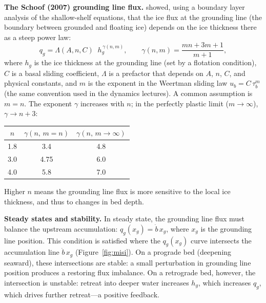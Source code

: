 \documentclass[11pt]{article}
\begin{document}
\medskip
\noindent\textbf{The Schoof (2007) grounding line flux.}  \cite{Schoof2007} showed, using a boundary layer analysis of the shallow-shelf equations, that the ice flux at the grounding line (the boundary between grounded and floating ice) depends on the ice thickness there as a steep power law:
\begin{equation}
  q_g = \Lambda(A, n, C)\;\; h_g^{\,\gamma(n,m)}, \qquad \gamma(n,m) = \frac{mn+3m+1}{m+1},
  \label{eq:schoof_flux}
\end{equation}
where $h_g$ is the ice thickness at the grounding line (set by a flotation condition), $C$ is a basal sliding coefficient, $\Lambda$ is a prefactor that depends on $A$, $n$, $C$, and physical constants, and $m$ is the exponent in the Weertman sliding law $u_b = C\,\tau_b^m$ (the same convention used in the dynamics lectures).  A common assumption is $m = n$.  The exponent $\gamma$ increases with $n$; in the perfectly plastic limit ($m \to \infty$), $\gamma \to n + 3$:

\begin{center}
\begin{tabular}{ccc}
\toprule
$n$ & $\gamma(n,\,m=n)$ & $\gamma(n,\,m\to\infty)$ \\
\midrule
1.8 & 3.4 & 4.8 \\
3.0 & 4.75 & 6.0 \\
4.0 & 5.8 & 7.0 \\
\bottomrule
\end{tabular}
\end{center}

\noindent Higher $n$ means the grounding line flux is more sensitive to the local ice thickness, and thus to changes in bed depth.

\medskip
\noindent\textbf{Steady states and stability.}  In steady state, the grounding line flux must balance the upstream accumulation: $q_g(x_g) = \dot{b}\,x_g$, where $x_g$ is the grounding line position.  This condition is satisfied where the $q_g(x_g)$ curve intersects the accumulation line $\dot{b}\,x_g$ (Figure~\ref{fig:misi}).  On a prograde bed (deepening seaward), these intersections are stable: a small perturbation in grounding line position produces a restoring flux imbalance.  On a retrograde bed, however, the intersection is unstable: retreat into deeper water increases $h_g$, which increases $q_g$, which drives further retreat---a positive feedback.
\end{document}

